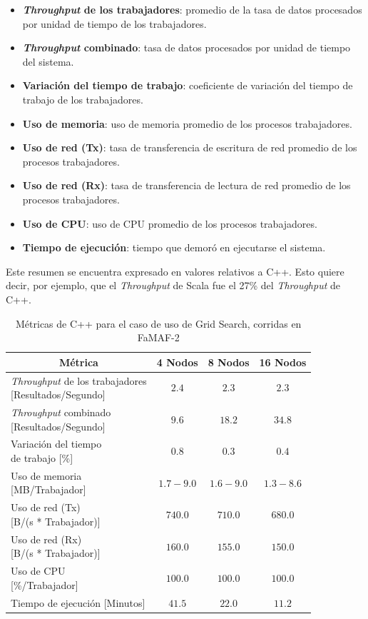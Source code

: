 \documentclass[11pt]{article}
\providecommand{\row}[1]{\parbox{150pt}{\setlength{\baselineskip}{0.2\baselineskip}\strut#1\strut}}
\newcommand{\gscap}[2]{\caption{Métricas de #1 para el caso de uso de Grid Search, corridas en #2}}
\newcommand{\english}[1]{\textit{#1}}
\begin{document}
\begin{itemize}
    \item \textbf{\english{Throughput} de los trabajadores}: promedio de la tasa de datos procesados por unidad de tiempo de los trabajadores.
    \item \textbf{\english{Throughput} combinado}: tasa de datos procesados por unidad de tiempo del sistema.
    \item \textbf{Variación  del tiempo de trabajo}: coeficiente de variación del tiempo de trabajo de los trabajadores.
    \item \textbf{Uso de memoria}: uso de memoria promedio de los procesos trabajadores.
    \item \textbf{Uso de red (Tx)}: tasa de transferencia de escritura de red promedio de los procesos trabajadores.
    \item \textbf{Uso de red (Rx)}: tasa de transferencia de lectura de red promedio de los procesos trabajadores.
    \item \textbf{Uso de CPU}: uso de CPU promedio de los procesos trabajadores.
    \item \textbf{Tiempo de ejecución}: tiempo que demoró en ejecutarse el sistema.
\end{itemize}

Este resumen se encuentra expresado en valores relativos a C++. Esto quiere decir, por ejemplo, que el \english{Throughput} de Scala fue el 27\% del \english{Throughput} de C++.

\begin{table}[H]
\centering
\begin{tabular}{|l|c|c|c|}
\hline
\multicolumn{1}{|c|}{Métrica} & 4 Nodos & 8 Nodos & 16 Nodos \\ \hline
\row{\english{Throughput} de los trabajadores\\{[Resultados/Segundo]}} & $2.4$  & $2.3$ & $2.3$ \\ \hline
\row{\english{Throughput} combinado\\{[Resultados/Segundo]}}  & $9.6$  & $18.2$ & $34.8$ \\ \hline
\row{Variación del tiempo\\de trabajo {[\%]}} & $0.8$& $0.3$& $0.4$\\ \hline
\row{Uso de memoria\\{[MB/Trabajador]}} & $1.7-9.0$  & $1.6-9.0$ & $1.3-8.6$ \\ \hline
\row{Uso de red (Tx)\\{[B/(s * Trabajador)]}} & $740.0$ & $710.0$ & $680.0$ \\ \hline
\row{Uso de red (Rx)\\{[B/(s * Trabajador)]}} & $160.0$ & $155.0$ & $150.0$ \\ \hline
\row{Uso de CPU\\{[\%/Trabajador]}} & $100.0$ & $100.0$ & $100.0$ \\ \hline
Tiempo de ejecución [Minutos] & $41.5$ & $22.0$ & $11.2$ \\ \hline
\end{tabular}
\gscap{C++}{FaMAF-2}
\end{table}
\end{document}
